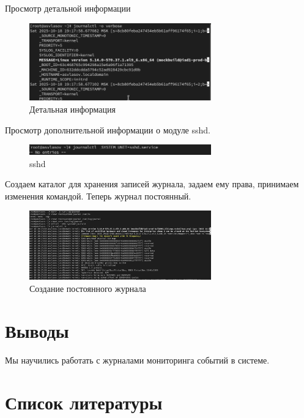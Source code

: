 \documentclass[
  12pt,
  a4paper,
  DIV=11,
  numbers=noendperiod]{scrreprt}
\begin{document}
Просмотр детальной информации

\begin{figure}

{\centering \includegraphics[width=0.7\textwidth,height=\textheight]{image/14.png}

}

\caption{Детальная информация}

\end{figure}%

Просмотр дополнительной информации о модуле sshd.

\begin{figure}

{\centering \includegraphics[width=0.7\textwidth,height=\textheight]{image/15.png}

}

\caption{sshd}

\end{figure}%

Создаем каталог для хранения записей журнала, задаем ему права,
принимаем изменения командой. Теперь журнал постоянный.

\begin{figure}

{\centering \includegraphics[width=0.7\textwidth,height=\textheight]{image/16.png}

}

\caption{Создание постоянного журнала}

\end{figure}%

\chapter{Выводы}\label{ux432ux44bux432ux43eux434ux44b}

Мы научились работать с журналами мониторинга событий в системе.

\chapter*{Список
литературы}\label{ux441ux43fux438ux441ux43eux43a-ux43bux438ux442ux435ux440ux430ux442ux443ux440ux44b}

\printbibliography[heading=none]
\end{document}
